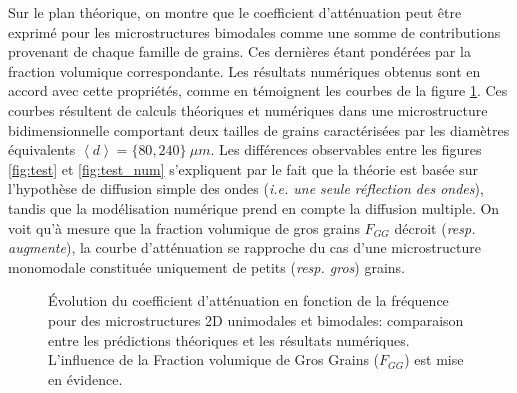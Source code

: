 Sur le plan théorique, on montre que le coefficient d'atténuation peut être exprimé pour les microstructures bimodales comme une somme de contributions provenant de chaque famille de grains.
Ces dernières étant pondérées par la fraction volumique correspondante.
Les résultats numériques obtenus sont en accord avec cette propriétés, comme en témoignent les courbes de la figure \ref{fig:attenuation}.
Ces courbes résultent de calculs théoriques et numériques dans une microstructure bidimensionnelle comportant deux tailles de grains caractérisées par les diamètres équivalents $\left\langle d \right\rangle =\{80,240\} \: \mu m$.
Les différences observables entre les figures \ref{fig:test} et \ref{fig:test_num} s'expliquent par le fait que la théorie est basée sur l'hypothèse de diffusion simple des ondes (\textit{i.e. une seule réflection des ondes}), tandis que la modélisation numérique prend en compte la diffusion multiple. 
On voit qu'à mesure que la fraction volumique de gros grains $F_{GG}$ décroit (\textit{resp. augmente}), la courbe d'atténuation se rapproche du cas d'une microstructure monomodale constituée uniquement de petits (\textit{resp. gros}) grains.
\begin{figure}[h!]
  \centering
  {}
  {}
  
  \caption{{\'E}volution du coefficient d'atténuation en fonction de la fréquence pour des microstructures 2D unimodales et bimodales: comparaison entre les prédictions théoriques et les résultats numériques. L'influence de la Fraction volumique de Gros Grains ($F_{GG}$) est mise en évidence.}
  \label{fig:attenuation}
\end{figure}



